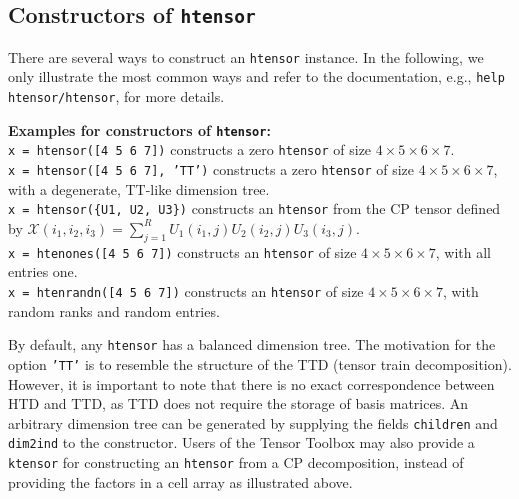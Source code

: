 \documentclass[11pt, a4paper]{article}
\newcommand{\calX}{\mathcal{X}}
\begin{document}
\subsection{Constructors of {\tt htensor}} \label{sec:constructor}
%
There are several ways to construct an \texttt{htensor} instance. In the following,
we only illustrate the most common ways and refer to the documentation, e.g., {\tt help htensor/htensor},
for more details. 
\begin{framed}
\noindent \textbf{Examples for constructors of \texttt{htensor}:}\\
\texttt{x = htensor([4 5 6 7])} constructs a zero \texttt{htensor} of size $4 \times 5 \times 6 \times 7$.\\
\texttt{x = htensor([4 5 6 7], 'TT')} constructs a zero \texttt{htensor} of size $4 \times 5 \times 6 \times 7$, with a degenerate, TT-like dimension tree.\\
\texttt{x = htensor(\{U1, U2, U3\})} constructs an \texttt{htensor} from the CP tensor defined by $\calX(i_1, i_2, i_3) = \sum_{j=1}^R U_1(i_1, j) U_2(i_2, j) U_3(i_3, j)$. \\
\texttt{x = htenones([4 5 6 7])} constructs an \texttt{htensor} of size $4 \times 5 \times 6 \times 7$, with all entries one.\\
\texttt{x = htenrandn([4 5 6 7])} constructs an \texttt{htensor} of size $4 \times 5 \times 6 \times 7$, with random ranks and random entries.
\end{framed}
By default, any \texttt{htensor} has a balanced dimension tree.
The motivation for the option {\tt 'TT'} is to resemble the structure
of the TTD (tensor train decomposition). However, it is important to
note that there is no exact correspondence between HTD and TTD, as TTD
does not require the storage of basis matrices. An arbitrary dimension
tree can be generated by supplying the fields \texttt{children} and
\texttt{dim2ind} to the constructor.
Users of the Tensor Toolbox may also provide a \texttt{ktensor}
for constructing an \texttt{htensor} from a CP decomposition, instead of
providing the factors in a cell array as illustrated above.

%
%
\end{document}
